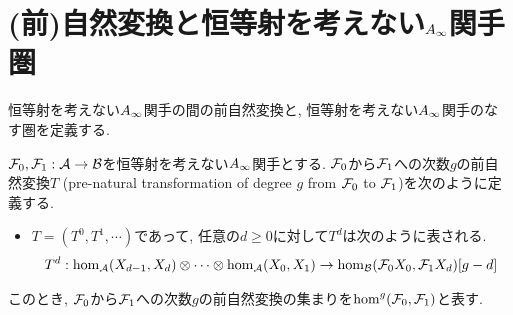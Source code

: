 \documentclass[uplatex, a4paper, 14Q, dvipdfmx]{jsarticle}
\begin{document}
\section{(前)自然変換と恒等射を考えない\texorpdfstring{$A_{\infty}$}{Ainf}関手圏} \label{section_non_unital_Ainf_functor_cat}

恒等射を考えない$A_{\infty}$関手の間の前自然変換と, 恒等射を考えない$A_{\infty}$関手のなす圏を定義する. 

\begin{definition}[前自然変換]
  $\mathcal{F}_0,\mathcal{F}_1 : \mathcal{A} \to \mathcal{B}$を恒等射を考えない$A_{\infty}$関手とする. 
  $\mathcal{F}_0$から$\mathcal{F}_1$への次数$g$の前自然変換$T$ (pre-natural transformation of degree $g$ from $\mathcal{F}_0$ to $\mathcal{F}_1$)を次のように定義する. 
  \begin{itemize}
    \item $T = (T^0, T^1, \cdots)$であって, 任意の$d \geq 0$に対して$T^d$は次のように表される. 
    \begin{align*}
      T^d : \hom_{\mathcal{A}}(X_{d-1},X_d) \otimes \cdots \otimes \hom_{\mathcal{A}}(X_0,X_1) \to \hom_{\mathcal{B}}(\mathcal{F}_0 X_0,\mathcal{F}_1 X_d)[g-d]
    \end{align*}
  \end{itemize}
  このとき, $\mathcal{F}_0$から$\mathcal{F}_1$への次数$g$の前自然変換の集まりを$\hom^g(\mathcal{F}_0,\mathcal{F}_1)$と表す. 
\end{definition}
\end{document}
